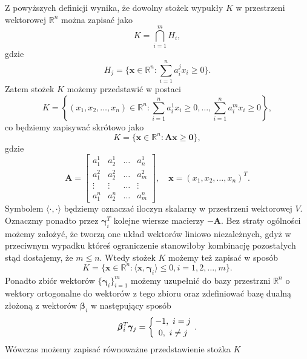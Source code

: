 \documentclass[12pt]{mwart}
\begin{document}
Z powyższych definicji wynika, że dowolny stożek wypukły $K$ w przestrzeni wektorowej $\mathbb{R}^n$ można zapisać jako 
\begin{displaymath}
K=\bigcap_{i=1}^m{H_i},
\end{displaymath}
gdzie
\begin{displaymath}
H_j=\{\textbf{x}\in \mathbb{R}^n\colon \sum_{i=1}^na^j_ix_i\geq 0\}.
\end{displaymath}
Zatem stożek $K$ możemy przedstawić w postaci
\begin{displaymath}
K=\left\{(x_1,x_2,\dots,x_n)\in \mathbb{R}^n\colon \sum_{i=1}^na^1_i x_i\geq 0, \dots , \sum_{i=1}^n a^m_i x_i\geq 0\right\},
\end{displaymath}
co będziemy zapisywać skrótowo jako
\begin{displaymath}
K=\{\textbf{x}\in \mathbb{R}^n\colon  \textbf{A}\textbf{x}\geq \mathbf{0}\},
\end{displaymath}
gdzie
\begin{displaymath}
\textbf{A}=\left[
\begin{array}{cccc}
a_1^1&a_2^1&\dots&a_n^1\\a_1^2&a_2^2&\dots&a_m^2\\ \vdots &\vdots &\ldots &\vdots\\
a_1^n&a_2^n&\dots &a_m^n
\end{array}\right],\quad \textbf{x}=(x_1,x_2,\dots,x_n)^T.
\end{displaymath}
Symbolem $\langle \cdot , \cdot \rangle$ będziemy oznaczać iloczyn skalarny w przestrzeni wektorowej $V$.
Oznaczmy ponadto przez $\pmb{\gamma}_i^T$ kolejne wiersze macierzy $-\textbf{A}$. Bez straty ogólności możemy założyć, że tworzą one układ wektorów liniowo niezależnych, gdyż w przeciwnym wypadku któreś ograniczenie stanowiłoby kombinację pozostałych stąd dostajemy, że $m\leq n$. Wtedy stożek $K$ możemy też zapisać w sposób 
\begin{displaymath}
K=\{\textbf{x}\in \mathbb{R}^n\colon \langle \textbf{x}, \pmb{\gamma}_i\rangle \leq 0, i=1,2,\dots,m\}.
\end{displaymath}
Ponadto zbiór wektorów $\{\pmb{\gamma}_i\}_{i=1}^m$ możemy uzupełnić do bazy przestrzni $\mathbb{R}^n$ o wektory ortogonalne do wektorów z tego zbioru oraz zdefiniować bazę dualną złożoną z wektorów $\pmb{\beta}_i$ w następujący sposób
\begin{eqnarray}\label{bazy}
\pmb{\beta}_i^T\pmb{\gamma}_j=\left\{{-1,\ i=j}\atop {0,\ i\neq j}\right. .
\end{eqnarray}
Wówczas możemy zapisać równoważne przedstawienie stożka $K$
\end{document}
